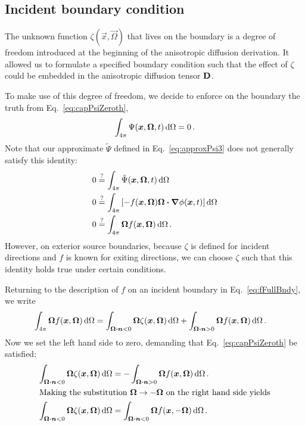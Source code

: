 \subsection{Incident boundary condition}\label{sec:zeta}

The unknown function $\zeta(\vec{x}, \vec{\Omega})$ that lives on the boundary
is a degree of freedom introduced at the beginning of the anisotropic
diffusion derivation. It allowed us to formulate a specified boundary condition
such that the effect of $\zeta$ could be embedded in the anisotropic diffusion
tensor $\mathbf{D}$.

To make use of this degree of freedom, we decide to enforce on the boundary the
truth from Eq.~\eqref{eq:capPsiZeroth},
\begin{equation*}
  \int_{4\pi} \Psi(\bm{x}, \bm{\Omega}, t) \mathop{}\!\mathrm{d}\Omega
  = 0 \,.
\end{equation*}
Note that our approximate $\tilde\Psi$ defined in Eq.~\eqref{eq:approxPsi3}
does not generally satisfy this identity:
\begin{align*}
  0
&\stackrel{\mathrm{?}}{=} \int_{4\pi} \tilde\Psi(\bm{x}, \bm{\Omega}, t) \mathop{}\!\mathrm{d}\Omega
\\
0 &\stackrel{\mathrm{?}}{=} \int_{4\pi} \left[ - f(\bm{x}, \bm{\Omega}) \bm{\Omega}
\bm{\cdot} \bm{\nabla} \phi(\bm{x}, t)\right]
\mathop{}\!\mathrm{d}\Omega
\\
0 &\stackrel{\mathrm{?}}{=} \int_{4\pi} \bm{\Omega} f(\bm{x}, \bm{\Omega})\mathop{}\!\mathrm{d}\Omega \,.
\end{align*}
However, on exterior source boundaries, because $\zeta$ is defined for incident
directions and $f$ is known for exiting directions, we can choose $\zeta$ such
that this identity holds true under certain conditions.

Returning to the description of $f$ on an incident boundary in
Eq.~\eqref{eq:fFullBndy}, we write
\begin{align*}
  \int_{4\pi} \bm{\Omega} f(\bm{x}, \bm{\Omega})\mathop{}\!\mathrm{d}\Omega
  &= \int_{\bm{\Omega} \bm{\cdot} \bm{n} < 0}
  \bm{\Omega} \zeta(\bm{x}, \bm{\Omega})\mathop{}\!\mathrm{d}\Omega
  + \int_{\bm{\Omega} \bm{\cdot} \bm{n} > 0}
  \bm{\Omega} f(\bm{x}, \bm{\Omega})\mathop{}\!\mathrm{d}\Omega\,.
\end{align*}
Now we set the left hand side to zero, demanding that
Eq.~\eqref{eq:capPsiZeroth} be satisfied:
\begin{align}
  \label{eq:zetaCondition1}
  \int_{\bm{\Omega} \bm{\cdot} \bm{n} < 0}
  \bm{\Omega} \zeta(\bm{x}, \bm{\Omega})\mathop{}\!\mathrm{d}\Omega
  &= -\int_{\bm{\Omega} \bm{\cdot} \bm{n} > 0}
  \bm{\Omega} f(\bm{x}, \bm{\Omega})\mathop{}\!\mathrm{d}\Omega \,.
  \\ 
  \intertext{Making the substitution $\bm{\Omega}\to -\bm{\Omega}$ on the
  right hand side yields}
  \label{eq:zetaCondition2}
  \int_{\bm{\Omega} \bm{\cdot} \bm{n} < 0}
  \bm{\Omega} \zeta(\bm{x}, \bm{\Omega})\mathop{}\!\mathrm{d}\Omega
  &= \int_{\bm{\Omega} \bm{\cdot} \bm{n} < 0}
  \bm{\Omega} f(\bm{x}, -\bm{\Omega})\mathop{}\!\mathrm{d}\Omega \,.
\end{align}

